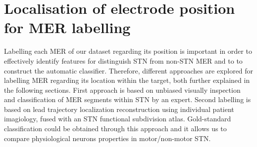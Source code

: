 \section{Localisation of electrode position for MER labelling}

Labelling each MER of our dataset regarding its position is important in order to effectively identify features for distinguish STN from non-STN MER and to  to construct the automatic classifier. Therefore, different approaches are explored for labelling MER regarding its location within the target, both further explained in the following sections. First approach is based on unbiased visually inspection and classification of MER segments within STN by an expert. Second labelling is based on lead trajectory localization reconstruction using individual patient imagiology, fused with an STN functional subdivision atlas. Gold-standard classification could be obtained through this approach and it allows us to compare physiological neurons properties in motor/non-motor STN.








